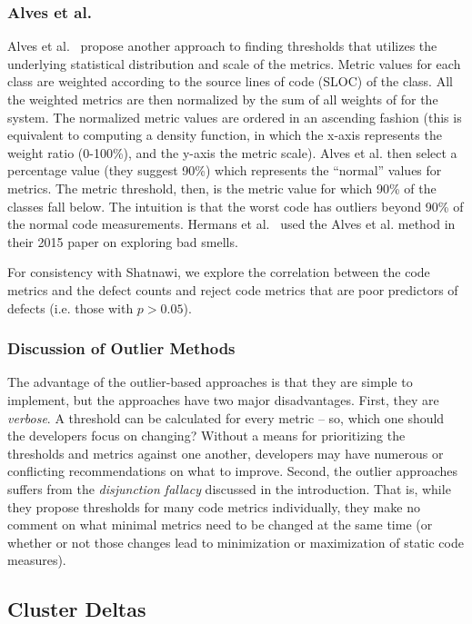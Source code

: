 \documentclass[twocolumn,5p]{elsarticle}
\theoremstyle{break}
\begin{document}
 
\subsubsection{ Alves et al.}
Alves et al.~\cite{Alves2010} propose another approach
to finding thresholds that  utilizes the underlying statistical distribution and scale of the metrics. 
Metric values for each class are weighted according to the source lines of code (SLOC) of the class. All the weighted metrics are then normalized by the sum of all weights of for the system. 
The normalized metric values are ordered in an ascending fashion (this is equivalent to computing a density function, in which the x-axis represents the weight ratio (0-100\%), and the y-axis the metric scale).
Alves et al. then select a percentage value (they suggest 90\%) which represents the ``normal'' values for metrics. The metric threshold, then, is the metric value for which 90\% of the classes fall below. The intuition  is that the worst code has outliers beyond 90\% of the normal code measurements. Hermans et al.~\cite{hermans15} used the
Alves et al. method in their  2015 paper on
exploring bad smells.

For consistency
with Shatnawi, we explore the correlation between
the code metrics and the defect counts and   reject code metrics that are poor predictors of defects (i.e.   those  with $p > 0.05$).

\subsubsection{Discussion of Outlier Methods}\label{sect:disc}
The advantage of the outlier-based
approaches is that they are simple to implement, but the approaches have   two  major disadvantages. 
First, they are {\em verbose}. A threshold can be calculated for every metric -- so, which one should the developers focus on changing? Without a means for prioritizing the  thresholds and metrics against one another, developers may have numerous or conflicting recommendations on what to improve. Second, the outlier approaches suffers from
the {\em disjunction fallacy}  discussed in the introduction.
That is, while
 they propose thresholds for many code metrics
individually, they make no comment on what minimal
metrics need to be changed at the same time (or whether or not those
changes lead to minimization or maximization of static code measures).


\subsection{Cluster Deltas}
\end{document}
